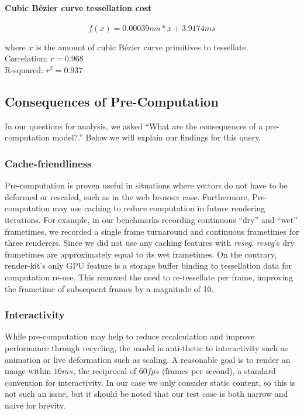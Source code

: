 \paragraph{Cubic Bézier curve tessellation cost}
\begin{equation}\label{eq:tesscost_cubic_bezier}
f(x)=0.00039ms*x+3.9174ms
\end{equation}
\begin{center}
where \(x\) is the amount of cubic Bézier curve primitives to tessellate.\\
Correlation: \(r=0.968\)\\
R-squared:	\(r^2=0.937\)
\end{center}

\subsection{Consequences of Pre-Computation}
In our questions for analysis, we asked ``What are the consequences of a pre-computation model?.'' Below we will explain our findings for this query.\medskip

\subsubsection{Cache-friendliness}
Pre-computation is proven useful in situations where vectors do not have to be deformed or rescaled, such as in the web browser case. Furthermore, Pre-computation may use caching to reduce computation in future rendering iterations. For example, in our benchmarks recording continuous ``dry'' and ``wet'' frametimes, we recorded a single frame turnaround and continuous frametimes for three renderers. Since we did not use any caching features with \textit{resvg}, \textit{resvg}'s dry frametimes are approximately equal to its wet frametimes. On the contrary, render-kit's only GPU feature is a storage buffer binding to tessellation data for computation re-use. This removed the need to re-tessellate per frame, improving the frametime of subsequent frames by a magnitude of 10.

\subsubsection{Interactivity} While pre-computation may help to reduce recalculation and improve performance through recycling, the model is anti-thetic to interactivity such as animation or live deformation such as scaling. A reasonable goal is to render an image within \(16ms\), the reciprocal of \(60fps\) (frames per second), a standard convention for interactivity. In our case we only consider static content, so this is not such an issue, but it should be noted that our test case is both narrow and naive for brevity.

